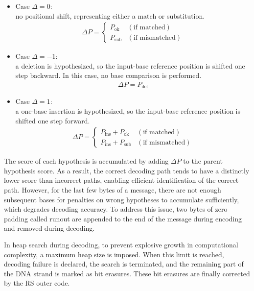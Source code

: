 \documentclass[sotsuron]{kuee}
\begin{document}
\begin{itemize}
  \item Case $\Delta = 0$: \\ no positional shift, representing either a match
  or substitution.
  \begin{align}
    \Delta P = \begin{cases}
      P_{\mathrm{ok}} & (\text{if matched}) \\
      P_{\mathrm{sub}} & (\text{if mismatched})
    \end{cases}
  \end{align}
  \item Case $\Delta = -1$:\\ a deletion is hypothesized, so the input-base
  reference position is shifted one step backward.
  In this case, no base comparison is performed.
  \begin{align}
    \Delta P = P_{\mathrm{del}}
  \end{align}
  \item Case $\Delta = 1$: \\ a one-base insertion is hypothesized, so the
  input-base reference position is shifted one step forward.
  \begin{align}
    \Delta P = \begin{cases}
      P_{\mathrm{ins}} + P_{\mathrm{ok}} & (\text{if matched}) \\
      P_{\mathrm{ins}} + P_{\mathrm{sub}} & (\text{if mismatched})
    \end{cases}
  \end{align}
\end{itemize}
The score of each hypothesis is accumulated by adding $\Delta P$ to the parent
hypothesis score.
As a result, the correct decoding path tends to have a distinctly lower score
than incorrect paths, enabling efficient identification of the correct path.
However, for the last few bytes of a message, there are not enough subsequent
bases for penalties on wrong hypotheses to accumulate sufficiently, which
degrades decoding accuracy.
To address this issue, two bytes of zero padding called runout are appended to
the end of the message during encoding and removed during decoding.

In heap search during decoding, to prevent explosive growth in computational
complexity, a maximum heap size is imposed.
When this limit is reached, decoding failure is declared, the search is
terminated, and the remaining part of the DNA strand is marked as bit erasures.
These bit erasures are finally corrected by the RS outer code.
\end{document}

